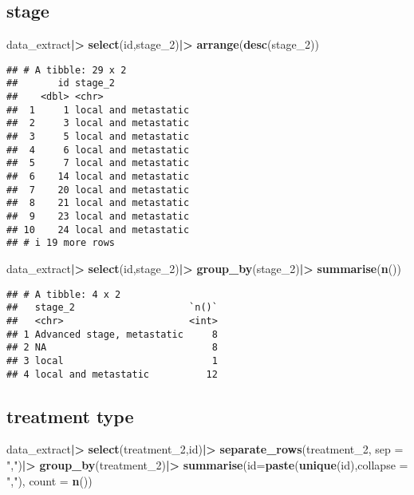 \documentclass[
]{article}
\newenvironment{Shaded}{\begin{snugshade}}{\end{snugshade}}
\newcommand{\AttributeTok}[1]{\textcolor[rgb]{0.13,0.29,0.53}{#1}}
\newcommand{\FunctionTok}[1]{\textcolor[rgb]{0.13,0.29,0.53}{\textbf{#1}}}
\newcommand{\NormalTok}[1]{#1}
\newcommand{\SpecialCharTok}[1]{\textcolor[rgb]{0.81,0.36,0.00}{\textbf{#1}}}
\newcommand{\StringTok}[1]{\textcolor[rgb]{0.31,0.60,0.02}{#1}}
\begin{document}
\subsection{stage}\label{stage}

\begin{Shaded}
\begin{Highlighting}[]
\NormalTok{data\_extract}\SpecialCharTok{|\textgreater{}}
  \FunctionTok{select}\NormalTok{(id,stage\_2)}\SpecialCharTok{|\textgreater{}}
  \FunctionTok{arrange}\NormalTok{(}\FunctionTok{desc}\NormalTok{(stage\_2))}
\end{Highlighting}
\end{Shaded}

\begin{verbatim}
## # A tibble: 29 x 2
##       id stage_2             
##    <dbl> <chr>               
##  1     1 local and metastatic
##  2     3 local and metastatic
##  3     5 local and metastatic
##  4     6 local and metastatic
##  5     7 local and metastatic
##  6    14 local and metastatic
##  7    20 local and metastatic
##  8    21 local and metastatic
##  9    23 local and metastatic
## 10    24 local and metastatic
## # i 19 more rows
\end{verbatim}

\begin{Shaded}
\begin{Highlighting}[]
\NormalTok{data\_extract}\SpecialCharTok{|\textgreater{}}
  \FunctionTok{select}\NormalTok{(id,stage\_2)}\SpecialCharTok{|\textgreater{}}
  \FunctionTok{group\_by}\NormalTok{(stage\_2)}\SpecialCharTok{|\textgreater{}}
  \FunctionTok{summarise}\NormalTok{(}\FunctionTok{n}\NormalTok{())}
\end{Highlighting}
\end{Shaded}

\begin{verbatim}
## # A tibble: 4 x 2
##   stage_2                    `n()`
##   <chr>                      <int>
## 1 Advanced stage, metastatic     8
## 2 NA                             8
## 3 local                          1
## 4 local and metastatic          12
\end{verbatim}

\subsection{treatment type}\label{treatment-type}

\begin{Shaded}
\begin{Highlighting}[]
\NormalTok{data\_extract}\SpecialCharTok{|\textgreater{}}
  \FunctionTok{select}\NormalTok{(treatment\_2,id)}\SpecialCharTok{|\textgreater{}}
  \FunctionTok{separate\_rows}\NormalTok{(treatment\_2, }\AttributeTok{sep =} \StringTok{","}\NormalTok{)}\SpecialCharTok{|\textgreater{}}
  \FunctionTok{group\_by}\NormalTok{(treatment\_2)}\SpecialCharTok{|\textgreater{}}
  \FunctionTok{summarise}\NormalTok{(}\AttributeTok{id=}\FunctionTok{paste}\NormalTok{(}\FunctionTok{unique}\NormalTok{(id),}\AttributeTok{collapse =} \StringTok{","}\NormalTok{), }\AttributeTok{count =} \FunctionTok{n}\NormalTok{())}
\end{Highlighting}
\end{Shaded}
\end{document}
